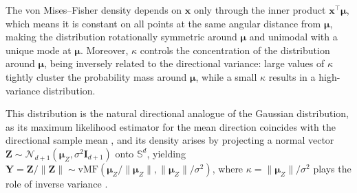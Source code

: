 \documentclass[12pt]{report} %
\newcommand{\bx}{\mathbf{x}}
\newcommand{\bmu}{\boldsymbol{\mu}}
\newcommand{\Sd}{\mathbb{S}^{d}}
\newcommand{\norm}[1]{\left|\left| #1\right|\right|}
\begin{document}
The von Mises--Fisher density depends on $\bx$ only through the inner product $\bx^\top\bmu$, which means it is constant on all points at the same angular distance from $\bmu$, making the distribution rotationally symmetric around $\bmu$ and unimodal with a unique mode at $\bmu$. Moreover, $\kappa$ controls the concentration of the distribution around $\bmu$, being inversely related to the directional variance: large values of $\kappa$ tightly cluster the probability mass around $\bmu$, while a small $\kappa$ results in a high-variance distribution.

This distribution is the natural directional analogue of the Gaussian distribution, as its maximum likelihood estimator for the mean direction coincides with the directional sample mean \citep{Bingham1975}, and its density arises by projecting a normal vector $\mathbf{Z}\sim\mathcal{N}_{d+1}(\bmu_Z,\sigma^2\mathbf{I}_{d+1})$ onto $\Sd$, yielding $\mathbf{Y}=\mathbf{Z}/\|\mathbf{Z}\|\sim\mathrm{vMF}(\bmu_Z/\|\bmu_Z\|,\|\bmu_Z\|/\sigma^2)$, where $\kappa=\|\bmu_Z\|/\sigma^2$ plays the role of inverse variance \citep{Gatto2011}.

\end{document}
